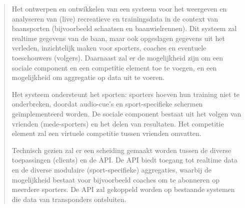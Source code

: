\begin{quotation}
Het ontwerpen en ontwikkelen van een systeem voor het weergeven en analyseren van (live) recreatieve en trainingsdata in de context van baansporten (bijvoorbeeld schaatsen en baanwielrennen). Dit systeem zal realtime gegevens van de baan, maar ook opgeslagen gegevens uit het verleden, inzichtelijk maken voor sporters, coaches en eventuele toeschouwers (volgers). Daarnaast zal er de mogelijkheid zijn om een sociale component en een competitie element toe te voegen, en een mogelijkheid om aggregatie op data uit te voeren.

Het systeem ondersteunt het sporten: sporters hoeven hun training niet te onderbreken, doordat audio-cue's en sport-specifieke schermen geïmplementeerd worden. De sociale component bestaat uit het volgen van vrienden (mede-sporters) en het delen van resultaten. Het competitie element zal een virtuele competitie tussen vrienden omvatten.

Technisch gezien zal er een scheiding gemaakt worden tussen de diverse toepassingen (clients) en de API. De API biedt toegang tot realtime data en de diverse modulaire (sport-specifieke) aggregaties, waarbij de mogelijkheid bestaat voor bijvoorbeeld coaches om te abonneren op meerdere sporters. De API zal gekoppeld worden op bestaande systemen die data van transponders ontsluiten.
\end{quotation}